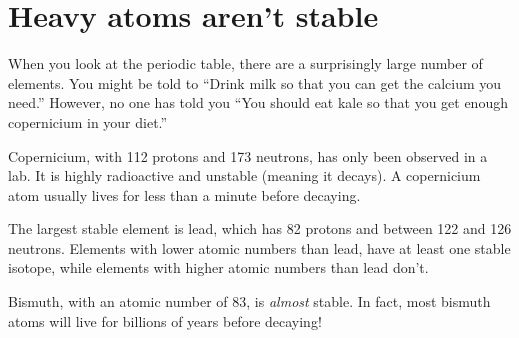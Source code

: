 \section{Heavy atoms aren't stable}

When you look at the periodic table, there are a surprisingly large
number of elements. You might be told to ``Drink milk so that you can
get the calcium you need.'' However, no one has told you ``You should
eat kale so that you get enough copernicium in your diet.''

Copernicium, with 112 protons and 173 neutrons, has only been observed
 in a lab. It is highly radioactive and unstable (meaning it decays). A copernicium
atom usually lives for less than a minute before decaying.

The largest stable element is lead, which has 82 protons and between
122 and 126 neutrons. Elements with lower atomic numbers than lead,
have at least one stable isotope, while elements with higher atomic numbers
than lead don't.

Bismuth, with an atomic number of 83, is \textit{almost} stable. In fact, most
bismuth atoms will live for billions of years before decaying!
